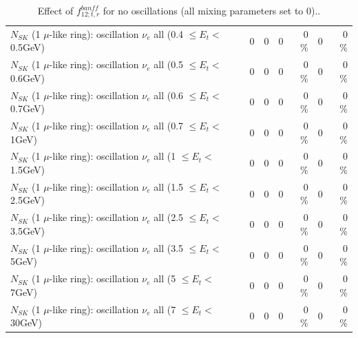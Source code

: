 \begin{table}
\begin{tabular}{| l | r | r | r  r | r  r |}
$N_{SK}$ (1 $\mu$-like ring): oscillation $\nu_{e}$ all (0.4 $\leq E_{t} <$ 0.5GeV) &               0 &               0 &               0 &        0 \%  &               0 &        0 \%  \\ 
$N_{SK}$ (1 $\mu$-like ring): oscillation $\nu_{e}$ all (0.5 $\leq E_{t} <$ 0.6GeV) &               0 &               0 &               0 &        0 \%  &               0 &        0 \%  \\ 
$N_{SK}$ (1 $\mu$-like ring): oscillation $\nu_{e}$ all (0.6 $\leq E_{t} <$ 0.7GeV) &               0 &               0 &               0 &        0 \%  &               0 &        0 \%  \\ 
$N_{SK}$ (1 $\mu$-like ring): oscillation $\nu_{e}$ all (0.7 $\leq E_{t} <$ 1GeV) &               0 &               0 &               0 &        0 \%  &               0 &        0 \%  \\ 
$N_{SK}$ (1 $\mu$-like ring): oscillation $\nu_{e}$ all (1 $\leq E_{t} <$ 1.5GeV) &               0 &               0 &               0 &        0 \%  &               0 &        0 \%  \\ 
$N_{SK}$ (1 $\mu$-like ring): oscillation $\nu_{e}$ all (1.5 $\leq E_{t} <$ 2.5GeV) &               0 &               0 &               0 &        0 \%  &               0 &        0 \%  \\ 
$N_{SK}$ (1 $\mu$-like ring): oscillation $\nu_{e}$ all (2.5 $\leq E_{t} <$ 3.5GeV) &               0 &               0 &               0 &        0 \%  &               0 &        0 \%  \\ 
$N_{SK}$ (1 $\mu$-like ring): oscillation $\nu_{e}$ all (3.5 $\leq E_{t} <$ 5GeV) &               0 &               0 &               0 &        0 \%  &               0 &        0 \%  \\ 
 $N_{SK}$ (1 $\mu$-like ring): oscillation $\nu_{e}$ all (5 $\leq E_{t} <$ 7GeV) &               0 &               0 &               0 &        0 \%  &               0 &        0 \%  \\ 
$N_{SK}$ (1 $\mu$-like ring): oscillation $\nu_{e}$ all (7 $\leq E_{t} <$ 30GeV) &               0 &               0 &               0 &        0 \%  &               0 &        0 \%  \\ 
\hline
\hline
\end{tabular}
\caption{ Effect of $f_{12; t, r}^{banff}$ for no oscillations (all mixing parameters set to 0).. }
\label{tab:num_banff_12_1RmuT_3f_osc_t13:0}
\end{table}
\clearpage
